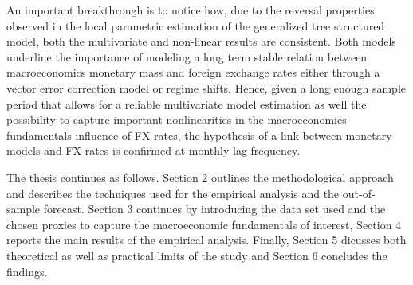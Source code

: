 An important breakthrough is to notice how, due to the reversal
properties observed in the local parametric estimation of the
generalized tree structured model, both the multivariate and
non-linear results are consistent. Both models underline the
importance of modeling a long term stable relation between
macroeconomics monetary mass and foreign exchange rates either through
a vector error correction model or regime shifts. Hence, given a long
enough sample period that allows for a reliable multivariate model
estimation as well the possibility to capture important nonlinearities
in the macroeconomics fundamentals influence of FX-rates, the
hypothesis of a link between monetary models and FX-rates is confirmed
at monthly lag frequency.

The thesis continues as follows. Section 2 outlines the methodological
approach and describes the techniques used for the empirical analysis
and the out-of-sample forecast. Section 3 continues by introducing the
data set used and the chosen proxies to capture the macroeconomic
fundamentals of interest, Section 4 reports the main results of the
empirical analysis. Finally, Section 5 dicusses both theoretical as
well as practical limits of the study and Section 6 concludes the
findings.
